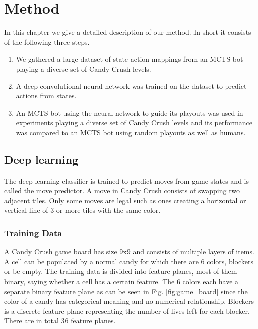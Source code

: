 \documentclass{kththesis}
\begin{document}
\chapter{Method}
In this chapter we give a detailed description of our method. In short it consists of the following three steps.
\begin{enumerate}
\item  We  gathered a large dataset of state-action mappings from an MCTS bot playing a diverse set of Candy Crush levels.
\item A deep convolutional neural network was trained on the dataset to predict actions from states.
\item An MCTS bot using the neural network to guide its playouts was used in experiments playing a diverse set of Candy Crush levels and its performance was compared to an MCTS bot using random playouts as well as humans.
\end{enumerate}
   

\section{Deep learning}
The deep  learning classifier is trained to predict moves from game states and is called the move predictor. A move in Candy Crush consists of swapping two adjacent tiles. Only some moves are legal such as ones creating a horizontal or vertical line of 3 or more tiles with the same color.

\subsection{Training Data}
A Candy Crush game board has size 9x9 and  consists of multiple layers of items. A cell can be populated by a normal candy for which there are 6 colors,  blockers or be empty. The training data is divided into feature planes, most of them binary, saying whether a cell has a certain feature.  The 6 colors each have a separate binary feature plane as can be seen in Fig. \ref{fig:game_board} since  the color of a candy has categorical meaning and no numerical relationship. Blockers is a discrete feature plane representing the number of lives left for each blocker. There are in total 36 feature planes. 
\end{document}

